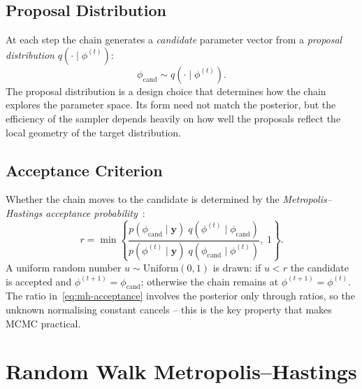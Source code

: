 \subsection{Proposal Distribution}

At each step the chain generates a \emph{candidate} parameter vector from
a \emph{proposal distribution} $q(\cdot \mid \phi^{(t)})$:
\begin{equation}
  \phi_{\mathrm{cand}} \sim q(\cdot \mid \phi^{(t)}).
\end{equation}
The proposal distribution is a design choice that determines how the
chain explores the parameter space. Its form need not match the posterior,
but the efficiency of the sampler depends heavily on how well the
proposals reflect the local geometry of the target distribution.

\subsection{Acceptance Criterion}

Whether the chain moves to the candidate is determined by the
\emph{Metropolis--Hastings acceptance probability}~\cite{hastings1970monte}:
\begin{equation}
  r = \min\!\left\{
    \frac{p(\phi_{\mathrm{cand}} \mid \mathbf{y})\;
    q(\phi^{(t)} \mid \phi_{\mathrm{cand}})}
    {p(\phi^{(t)} \mid \mathbf{y})\;
    q(\phi_{\mathrm{cand}} \mid \phi^{(t)})},\; 1
  \right\}.
  \label{eq:mh-acceptance}
\end{equation}
A uniform random number $u \sim \mathrm{Uniform}(0,1)$ is drawn: if
$u < r$ the candidate is accepted and $\phi^{(t+1)} =
\phi_{\mathrm{cand}}$; otherwise the chain remains at
$\phi^{(t+1)} = \phi^{(t)}$. The ratio in~\cref{eq:mh-acceptance}
involves the posterior only through ratios, so the unknown normalising
constant cancels -- this is the key property that makes MCMC practical.

\section{Random Walk Metropolis--Hastings}\label{sec:rwmh}

